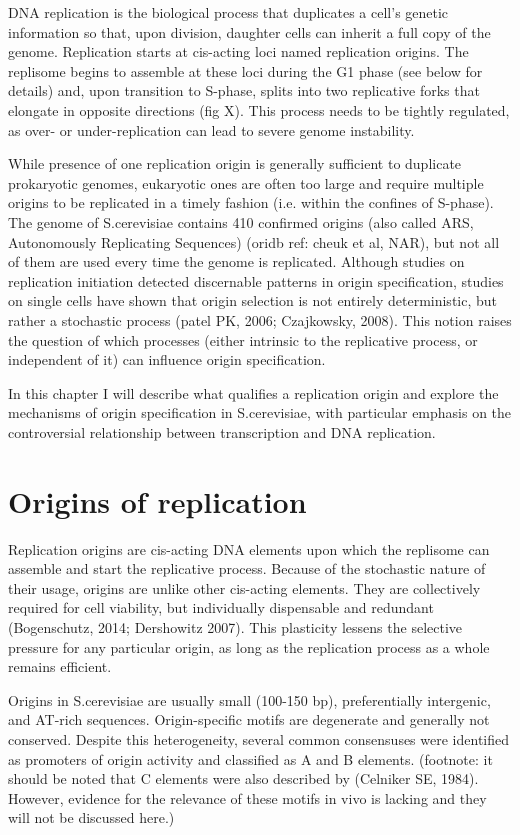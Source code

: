 DNA replication is the biological process that duplicates a cell’s genetic information so that, upon division, daughter cells can inherit a full copy of the genome. Replication starts at cis-acting loci named replication origins. The replisome begins to assemble at these loci during the G1 phase (see below for details) and, upon transition to S-phase, splits into two replicative forks that elongate in opposite directions (fig X). This process needs to be tightly regulated, as over- or under-replication can lead to severe genome instability. 

While presence of one replication origin is generally sufficient to duplicate prokaryotic genomes, eukaryotic ones are often too large and require multiple origins to be replicated in a timely fashion (i.e. within the confines of S-phase). The genome of S.cerevisiae contains 410 confirmed origins (also called ARS, Autonomously Replicating Sequences) (oridb ref: cheuk et al, NAR), but not all of them are used every time the genome is replicated. Although studies on replication initiation detected discernable patterns in origin specification, studies on single cells have shown that origin selection is not entirely deterministic, but rather a stochastic process (patel PK, 2006; Czajkowsky, 2008). This notion raises the question of which processes (either intrinsic to the replicative process, or independent of it) can influence origin specification.

In this chapter I will describe what qualifies a replication origin and explore the mechanisms of origin specification in S.cerevisiae, with particular emphasis on the controversial relationship between transcription and DNA replication.

\section{Origins of replication}

Replication origins are cis-acting DNA elements upon which the replisome can assemble and start the replicative process. Because of the stochastic nature of their usage, origins are unlike other cis-acting elements. They are collectively required for cell viability, but individually dispensable and redundant (Bogenschutz, 2014; Dershowitz 2007). This plasticity lessens the selective pressure for any particular origin, as long as the replication process as a whole remains efficient. 

Origins in S.cerevisiae are usually small (100-150 bp), preferentially intergenic, and AT-rich sequences. Origin-specific motifs are degenerate and generally not conserved. Despite this heterogeneity, several common consensuses were identified as promoters of origin activity and classified as A and B elements. (footnote: it should be noted that C elements were also described by (Celniker SE, 1984). However, evidence for the relevance of these motifs in vivo is lacking and they will not be discussed here.)

